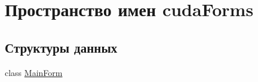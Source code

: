\hypertarget{namespacecuda_forms}{
\section{Пространство имен cudaForms}
\label{namespacecuda_forms}
}
\subsection*{Структуры данных}
\begin{CompactItemize}
\item 
class \hyperlink{classcuda_forms_1_1_main_form}{MainForm}
\end{CompactItemize}
